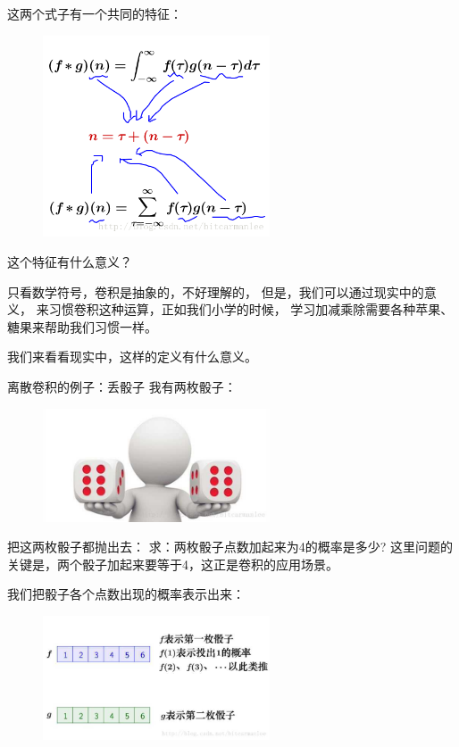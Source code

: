 这两个式子有一个共同的特征： 
\begin{figure}[hpbt]
  \centering
  \includegraphics[width=0.6\textwidth]{图像及其数学与物理背景/Figures/原理2}
\end{figure}

这个特征有什么意义？

只看数学符号，卷积是抽象的，不好理解的，%
但是，我们可以通过现实中的意义，%
来习惯卷积这种运算，正如我们小学的时候，%
学习加减乘除需要各种苹果、糖果来帮助我们习惯一样。

我们来看看现实中，这样的定义有什么意义。

离散卷积的例子：丢骰子
\noindent{}我有两枚骰子：
\begin{figure}[hpbt]
  \centering
  \includegraphics[width=0.6\textwidth]{图像及其数学与物理背景/Figures/色子1}
\end{figure}
把这两枚骰子都抛出去： %
求：两枚骰子点数加起来为4的概率是多少?%
这里问题的关键是，两个骰子加起来要等于4，这正是卷积的应用场景。%

我们把骰子各个点数出现的概率表示出来：
\begin{figure}[hpbt]
  \centering
  \includegraphics[width=0.6\textwidth]{图像及其数学与物理背景/Figures/色子2}
\end{figure}

